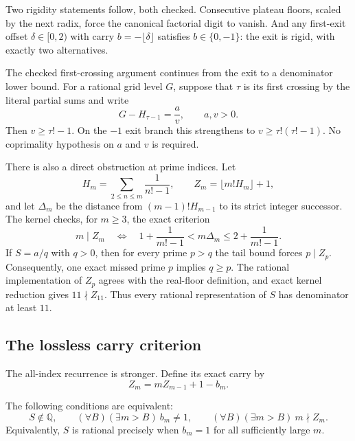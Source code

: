 \documentclass[11pt]{article}
\newcommand{\Ser}{S}
\begin{document}
Two rigidity statements follow, both checked.  Consecutive plateau floors,
scaled by the next radix, force the canonical factorial digit to vanish.  And
any first-exit offset $\delta\in[0,2)$ with carry $b=-\lfloor\delta\rfloor$
satisfies $b\in\{0,-1\}$: the exit is rigid, with exactly two alternatives.

The checked first-crossing argument continues from the exit to a denominator
lower bound.  For a rational grid level $G$, suppose that $\tau$ is its first
crossing by the literal partial sums and write
\[
  G-H_{\tau-1}=\frac{a}{v},\qquad a,v>0.
\]
Then $v\ge\tau!-1$.  On the $-1$ exit branch this strengthens to
$v\ge\tau!(\tau!-1)$.  No coprimality hypothesis on $a$ and $v$ is required.

There is also a direct obstruction at prime indices.  Let
\[
  H_m=\sum_{2\le n\le m}\frac1{n!-1},\qquad
  Z_m=\lfloor m!H_m\rfloor+1,
\]
and let $\Delta_m$ be the distance from $(m-1)!H_{m-1}$ to its strict integer
successor.  The kernel checks, for $m\ge3$, the exact criterion
\[
  m\mid Z_m
  \quad\Longleftrightarrow\quad
  1+\frac1{m!-1}<m\Delta_m\le2+\frac1{m!-1}.
\]
If $\Ser=a/q$ with $q>0$, then for every prime $p>q$ the tail bound forces
$p\mid Z_p$.  Consequently, one exact missed prime $p$ implies $q\ge p$.
The rational implementation of $Z_p$ agrees with the real-floor definition,
and exact kernel reduction gives $11\nmid Z_{11}$.  Thus every rational
representation of $\Ser$ has denominator at least $11$.

\subsection{The lossless carry criterion}

The all-index recurrence is stronger.  Define its exact carry by
\[
  Z_m=mZ_{m-1}+1-b_m .
\]
\begin{theorem}\label{res:carry-characterization}\label{res:strict-successor-complete-characterization}
The following conditions are equivalent:
\[
  \Ser\notin\mathbb Q,
  \qquad
  (\forall B)(\exists m>B)\ b_m\ne1,
  \qquad
  (\forall B)(\exists m>B)\ m\nmid Z_m.
\]
Equivalently, $\Ser$ is rational precisely when $b_m=1$ for all sufficiently
large $m$.
\end{theorem}
\end{document}
